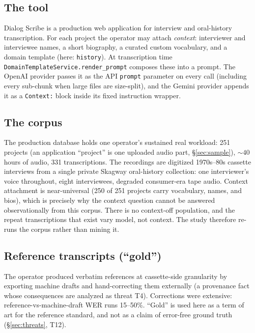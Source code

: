 \documentclass[11pt]{article}
\begin{document}
\subsection{The tool}

Dialog Scribe is a production web application for interview and oral-history transcription. For each project the operator may attach \emph{context}: interviewer and interviewee names, a short biography, a curated custom vocabulary, and a domain template (here: \texttt{history}). At transcription time \texttt{DomainTemplateService.render\_prompt} composes these into a prompt. The OpenAI provider passes it as the API \texttt{prompt} parameter on every call (including every sub-chunk when large files are size-split), and the Gemini provider appends it as a \texttt{Context:} block inside its fixed instruction wrapper.

\subsection{The corpus}

The production database holds one operator's sustained real workload: 251 projects (an application ``project'' is one uploaded audio part, \S\ref{sec:sample}), ${\sim}40$ hours of audio, 331 transcriptions. The recordings are digitized 1970s--80s cassette interviews from a single private Skagway oral-history collection: one interviewer's voice throughout, eight interviewees, degraded consumer-era tape audio. Context attachment is near-universal (250 of 251 projects carry vocabulary, names, and bios), which is precisely why the context question cannot be answered observationally from this corpus. There is no context-off population, and the repeat transcriptions that exist vary model, not context. The study therefore re-runs the corpus rather than mining it.

\subsection{Reference transcripts (``gold'')}

The operator produced verbatim references at cassette-side granularity by exporting machine drafts and hand-correcting them externally (a provenance fact whose consequences are analyzed as threat T4). Corrections were extensive: reference-vs-machine-draft WER runs 15--50\%. ``Gold'' is used here as a term of art for the reference standard, and not as a claim of error-free ground truth (\S\ref{sec:threats}, T12).
\end{document}
